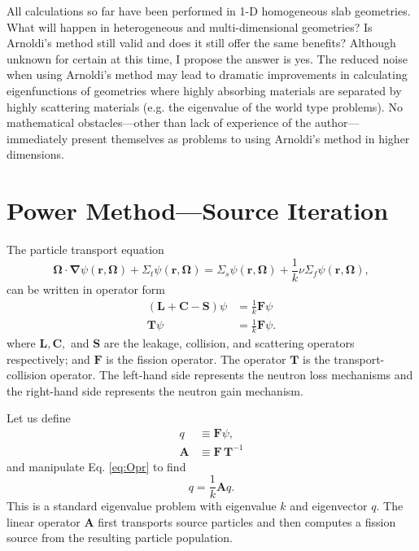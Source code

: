 \documentclass[11pt]{article}
\begin{document}
{    All calculations so far have been performed in 1-D homogeneous slab geometries.  What will happen in heterogeneous and multi-dimensional geometries?  Is Arnoldi's method still valid and does it still offer the same benefits?  Although unknown for certain at this time, I propose the answer is yes.  The reduced noise when using Arnoldi's method may lead to dramatic improvements in calculating eigenfunctions of geometries where highly absorbing materials are separated by highly scattering materials (e.g. the eigenvalue of the world type problems).  No mathematical obstacles---other than lack of experience of the author---immediately present themselves as problems to using Arnoldi's method in higher dimensions.  
}

\section{Power Method---Source Iteration}
The particle transport equation
\begin{equation}
    \mathbf{\Omega}\cdot\mathbf{\nabla}\psi(\mathbf{r},\mathbf{\Omega})+\Sigma_t\psi(\mathbf{r},\mathbf{\Omega}) = \Sigma_s\psi(\mathbf{r},\mathbf{\Omega}) + \frac{1}{k}\nu\Sigma_f\psi(\mathbf{r},\mathbf{\Omega}),
\end{equation}
can be written in operator form
\begin{subequations}\begin{align}
    (\mathbf{L} + \mathbf{C} - \mathbf{S})\psi &= \frac{1}{k}\mathbf{F}\psi \\
    \mathbf{T}\psi &= \frac{1}{k}\mathbf{F}\psi. \label{eq:Opr}
\end{align}\end{subequations}
where $\mathbf{L}, \mathbf{C},$ and $\mathbf{S}$ are the leakage, collision, and scattering operators respectively; and $\mathbf{F}$ is the fission operator.  The operator $\mathbf{T}$ is the transport-collision operator.  The left-hand side represents the neutron loss mechanisms and the right-hand side represents the neutron gain mechanism.

Let us define
\begin{align}
    q &\equiv \mathbf{F}\psi, \\
    \mathbf{A} &\equiv \mathbf{F}\,\mathbf{T}^{-1}
\end{align}
and manipulate Eq. \ref{eq:Opr} to find
\begin{equation}
    q = \frac{1}{k}\mathbf{A}q. \label{eq:evalue}
\end{equation}
This is a standard eigenvalue problem with eigenvalue $k$ and eigenvector $q$.  The linear operator $\mathbf{A}$ first transports source particles and then computes a fission source from the resulting particle population.
\end{document}

